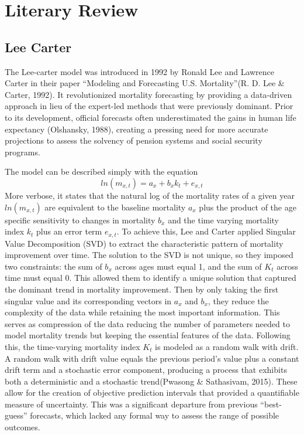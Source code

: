 \documentclass[
  12pt,
]{report}
\begin{document}
\chapter{Literary Review}\label{literary-review}

\section{Lee Carter}\label{lee-carter}

The Lee-carter model was introduced in 1992 by Ronald Lee and Lawrence
Carter in their paper ``Modeling and Forecasting U.S. Mortality''(R. D.
Lee \& Carter, 1992). It revolutionized mortality forecasting by
providing a data-driven approach in lieu of the expert-led methods that
were previously dominant. Prior to its development, official forecasts
often underestimated the gains in human life expectancy (Olshansky,
1988), creating a pressing need for more accurate projections to assess
the solvency of pension systems and social security programs.

The model can be described simply with the equation
\[ln(m_{x,t}) = a_x+b_xk_t+e_{x,t}\] More verbose, it states that the
natural log of the mortality rates of a given year \(ln(m_{x,t})\) are
equivalent to the baseline mortality \(a_x\) plus the product of the age
specific sensitivity to changes in mortality \(b_x\) and the time
varying mortality index \(k_t\) plus an error term \(e_{x,t}\). To
achieve this, Lee and Carter applied Singular Value Decomposition (SVD)
to extract the characteristic pattern of mortality improvement over
time. The solution to the SVD is not unique, so they imposed two
constraints: the sum of \(b_x\) across ages must equal 1, and the sum of
\(K_t\) across time must equal 0. This allowed them to identify a unique
solution that captured the dominant trend in mortality improvement. Then
by only taking the first singular value and its corresponding vectors in
\(a_x\) and \(b_x\), they reduce the complexity of the data while
retaining the most important information. This serves as compression of
the data reducing the number of parameters needed to model mortality
trends but keeping the essential features of the data. Following this,
the time-varying mortality index \(K_t\) is modeled as a random walk
with drift. A random walk with drift value equals the previous period's
value plus a constant drift term and a stochastic error component,
producing a process that exhibits both a deterministic and a stochastic
trend(Pwasong \& Sathasivam, 2015). These allow for the creation of
objective prediction intervals that provided a quantifiable measure of
uncertainty. This was a significant departure from previous
``best-guess'' forecasts, which lacked any formal way to assess the
range of possible outcomes.
\end{document}
